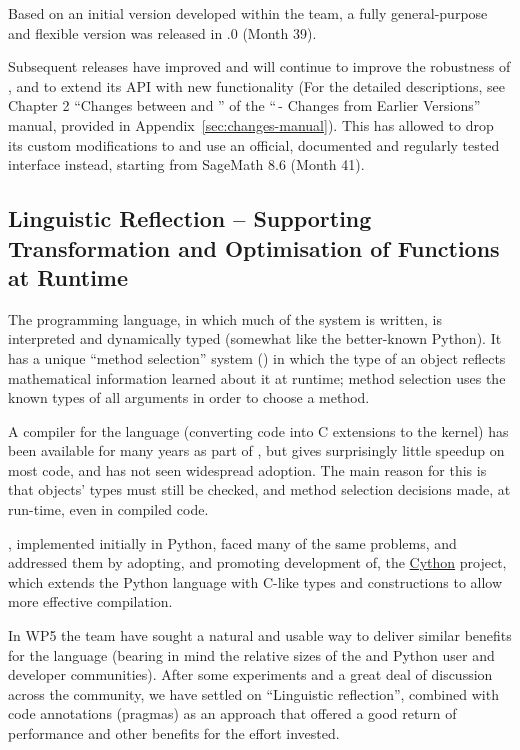 Based on an initial version developed within the \Sage team, a fully
general-purpose and flexible version was released in .0
(Month 39).

Subsequent releases have improved and will continue to improve the
robustness of , and to extend its API with new functionality
(For the detailed descriptions, see Chapter 2 
``Changes between  and '' of the 
``\GAP\,- Changes from Earlier Versions'' manual,
provided in Appendix~\ref{sec:changes-manual}).
This has allowed \Sage to drop its custom 
modifications to \GAP and use an official, documented and regularly 
tested \GAP interface instead, starting from SageMath 8.6 (Month 41).


\subsection{Linguistic Reflection -- Supporting Transformation and
  Optimisation of \GAP Functions at Runtime}\label{syntaxtree}
The \GAP programming language, in which much of the system is written,
is interpreted and dynamically typed (somewhat like the better-known
Python). It has a unique ``method selection'' system
(\cite{BreuerLinton98}) in which the type of an object reflects
mathematical information learned about it at runtime; method
selection uses the known types of all arguments in order to choose a method.

A compiler for the language (converting \GAP code
into C extensions to the \GAP kernel) has been available for many
years as part of \GAP, but gives surprisingly little speedup on most code, and has not
seen widespread adoption. The main reason for this is that objects'
types must still be checked, and method selection decisions made, at
run-time, even in compiled code.

\Sage, implemented initially in Python, faced many of the same
problems, and addressed them by adopting, and promoting
development of, the \href{http://cython.org}{Cython} project, which
extends the Python language with C-like types and constructions to
allow more effective compilation.

In WP5 the \GAP team have sought a natural and usable way to deliver
similar benefits for the \GAP language (bearing in mind the relative
sizes of the \GAP and Python user and developer communities). After
some experiments and a great deal of discussion across the community,
we have settled on ``Linguistic reflection'', combined with code
annotations (pragmas) as an approach that offered a good return of
performance and other benefits for the effort invested.

